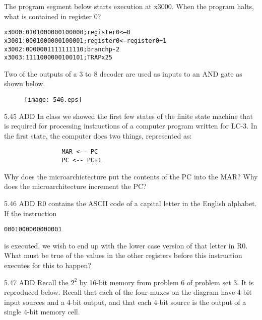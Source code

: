 \documentclass{patt}
\begin{document}
\begin{exercises}
 The program segment below starts execution at x3000.  When
the program halts, what is contained in register 0?

\begin{alltt}
               x3000: 0101 000 000 1 00000   ;register 0 <-- 0 
               x3001: 0001 000 000 1 00001   ;register 0 <-- register 0 + 1 
               x3002: 0000 001 111111110     ;branch p -2 
               x3003: 1111 0000 0010 0101    ;TRAP x25 


\end{alltt}

\vspace{0.25in}
 Two of the outputs of a 3 to 8 decoder are used as inputs
to an AND gate as shown below.
\vspace{0.1in}
\begin{figure}[h]
\centering
\texttt{[image: 546.eps]}
\end{figure}
\vspace{0.1in}

\newpage
\item[5.45]ADD In class we showed the first few states of the
finite state machine that is required for processing instructions of a computer
program written for LC-3.  In the first state, the computer does two things,
represented as:
\begin{verbatim}
                MAR <-- PC
                PC <-- PC+1
\end{verbatim}

\noindent
Why does the microarchictecture put the contents of the PC into the MAR?
\noindent 
Why does the microarchitecture increment the PC? \\

\vspace{0.1in}
\item[5.46]ADD R0 contains the ASCII code of a capital letter
in the English alphabet.  If the instruction\\
\begin{alltt}

        0001000000000001\\
\end{alltt}

\noindent
is executed, we wish to end up with the lower case version of that letter
in R0.  What must be true of the values in the other registers before
this instruction executes for this to happen?

\newpage 
\item[5.47]ADD Recall the $2^{2}$ by 16-bit memory from problem 6 of
problem set 3.  It is reproduced below.  Recall that each of the four muxes
on the diagram have 4-bit input sources and a 4-bit output, and that each
4-bit source is the output of a single 4-bit memory cell.


\end{exercises}
\end{document}
